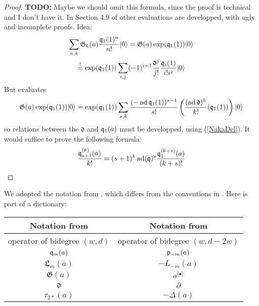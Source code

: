 \begin{proof}
\textbf{TODO:} Maybe we should omit this formula, since the proof is technical and I don't have it. In Section 4.9 of \cite{LehnSorger} other evaluations are developped, with ugly and incomplete proofs.
Idea:
\begin{gather*}
\sum_{n,k}\mathfrak{G}_k(a)\frac{\mathfrak{q}_1(1)^n}{n!}|0\rangle = \mathfrak{G}(a)\exp(\mathfrak{q}_1(1))|0\rangle \\
\stackrel{!}{=} \exp(\mathfrak{q}_1(1)) \sum_{i,j}(-1)^{i+1} \frac{\mathfrak d^j}{j!}\frac{\mathfrak{q}_i(1)}{i!i^j}|0\rangle
\end{gather*}
But \cite[Equation (4.6)]{LehnSorger} evaluates 
$$
 \mathfrak{G}(a)\exp(\mathfrak{q}_1(1))|0\rangle = \exp(\mathfrak{q}_1(1)) \sum_{s,k} \frac{(-\operatorname{ad} \mathfrak{q}_1(1))^{s-1}}{s!}\left(\frac{(\operatorname{ad} \mathfrak d)^k}{k!} (\mathfrak{q}_1(1)) \right)|0\rangle
$$
so relations between the $\mathfrak d$ and $\mathfrak{q}_1(a)$ must be developped, using (\ref{NakaDel}). It would suffice to prove the following formula:
$$
\frac{\mathfrak{q}_{s+1}^{(k)}(a)}{k!} = (s+1)^k \operatorname{ad}(\mathfrak{q})^s  \frac{\mathfrak{q}_1^{(k+s)}(a)}{(k+s)!}
$$
\end{proof}


\begin{remark}
We adopted the notation from \cite{LiQinWang}, which differs from the conventions in \cite{LehnSorger}. Here is part of a dictionary:

\begin{tabular}{c|c} 
Notation from \cite{LiQinWang} & Notation from \cite{LehnSorger} \\\hline
operator of bidegree $(w,d)$ & operator of bidegree $(w,d-2w)$\\
$\mathfrak{q}_m(a) $ & $\mathfrak{p}_{-m}(a)$ \\
$ \mathfrak{L}_m(a) $ & $ - L_{-m}(a)$ \\
$\mathfrak{G}(a)$ & $a^{[\bullet]}$\\
$ \mathfrak{d} $ & $ \partial $ \\
$\tau_{2*}(a)$& $-\Delta(a)$
\end{tabular}
\end{remark}


